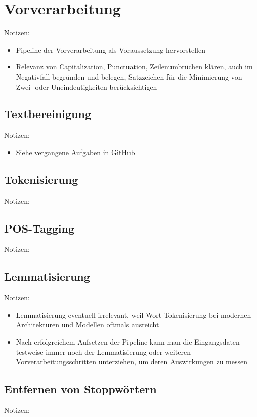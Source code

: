 \section{Vorverarbeitung}
Notizen:
\begin{itemize}
	\item Pipeline der Vorverarbeitung als Voraussetzung hervorstellen
	\item Relevanz von Capitalization, Punctuation, Zeilenumbrüchen klären, auch im Negativfall begründen und belegen, Satzzeichen für die Minimierung von Zwei- oder Uneindeutigkeiten berücksichtigen
\end{itemize}


\subsection{Textbereinigung}
Notizen:
\begin{itemize}
	\item Siehe vergangene Aufgaben in GitHub
\end{itemize}


\subsection{Tokenisierung}
Notizen:


\subsection{POS-Tagging}
Notizen:


\subsection{Lemmatisierung}
Notizen:
\begin{itemize}
	\item Lemmatisierung eventuell irrelevant, weil Wort-Tokenisierung bei modernen Architekturen und Modellen oftmals ausreicht
	\item Nach erfolgreichem Aufsetzen der Pipeline kann man die Eingangsdaten testweise immer noch der Lemmatisierung oder weiteren Vorverarbeitungsschritten unterziehen, um deren Auswirkungen zu messen
\end{itemize}


\subsection{Entfernen von Stoppwörtern}
Notizen:


